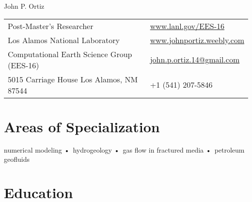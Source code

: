 \documentclass[11pt, letterpaper]{article}
\def\doubleline{

	\vspace{-1.4em}
	\hspace{\fill}\linethickness{0.7pt}\line(1,0){5.5in}\hspace{\fill}
	
	\vspace{-1.0em}
	\hspace{\fill}\linethickness{0.7pt}\line(1,0){5.5in}\hspace{\fill}
	
}
\begin{document}
{\LARGE John P. Ortiz} %




\begin{center}
	\begin{tabular}{l l}
		Post-Master's Researcher    & \hspace{.5in}\href{www.lanl.gov/EES-16}{www.lanl.gov/EES-16} \\
		Los Alamos National Laboratory   & \hspace{.5in}\href{http://johnportiz.weebly.com/}{www.johnportiz.weebly.com}   \\
		Computational Earth Science Group (EES-16)       & \hspace{.5in}\Letter {     } \href{mailto:john.p.ortiz.14@gmail.com}{john.p.ortiz.14@gmail.com}    \\ 
		5015 Carriage House   Los Alamos, NM 87544 & \hspace{.5in}\Mobilefone { } +1 (541) 207-5846  \\
		
	\end{tabular}
\end{center}


\section*{Areas of Specialization}
	numerical modeling •\ hydrogeology •\ gas flow in fractured media •\ petroleum geofluids
	

\section*{Education}
\noindent
\end{document}
